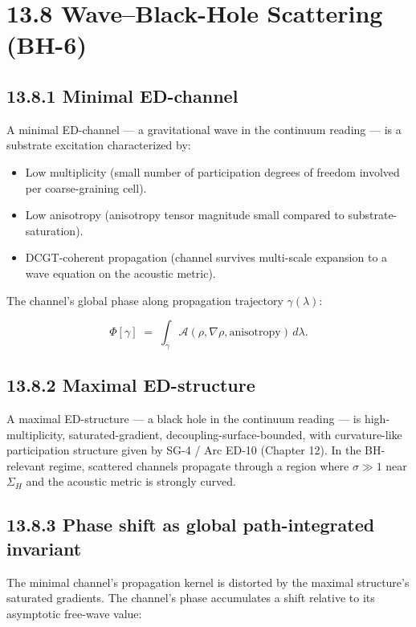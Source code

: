 \documentclass[11pt]{book}
\begin{document}
\section{13.8 Wave–Black-Hole Scattering (BH-6)}

\subsection{13.8.1 Minimal ED-channel}

A minimal ED-channel — a gravitational wave in the continuum reading — is a substrate excitation characterized by:
\begin{itemize}
\item Low multiplicity (small number of participation degrees of freedom involved per coarse-graining cell).
\item Low anisotropy (anisotropy tensor magnitude small compared to substrate-saturation).
\item DCGT-coherent propagation (channel survives multi-scale expansion to a wave equation on the acoustic metric).
\end{itemize}

The channel's global phase along propagation trajectory $\gamma(\lambda)$:

\[
\Phi[\gamma] \;=\; \int_\gamma \mathcal{A}(\rho, \nabla\rho, \mathrm{anisotropy})\,d\lambda.
\]

\subsection{13.8.2 Maximal ED-structure}

A maximal ED-structure — a black hole in the continuum reading — is high-multiplicity, saturated-gradient, decoupling-surface-bounded, with curvature-like participation structure given by SG-4 / Arc ED-10 (Chapter 12). In the BH-relevant regime, scattered channels propagate through a region where $\sigma \gg 1$ near $\Sigma_H$ and the acoustic metric is strongly curved.

\subsection{13.8.3 Phase shift as global path-integrated invariant}

The minimal channel's propagation kernel is distorted by the maximal structure's saturated gradients. The channel's phase accumulates a shift relative to its asymptotic free-wave value:
\end{document}
